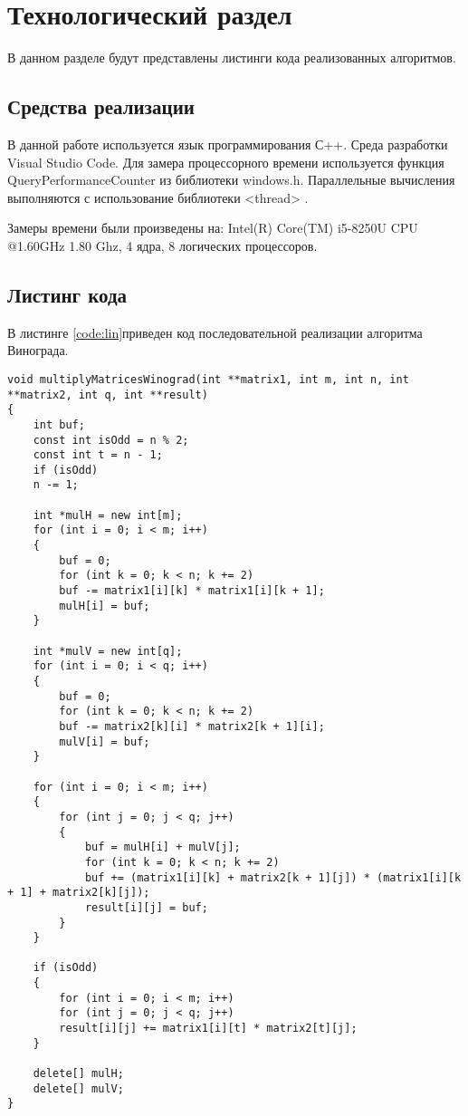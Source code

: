 \chapter{Технологический раздел}
\label{cha:impl}
В данном разделе будут представлены листинги кода реализованных алгоритмов.
\section{Средства реализации}
В данной работе используется язык программирования С++. Среда разработки Visual Studio Code. Для замера процессорного времени используется функция QueryPerformanceCounter из библиотеки windows.h. Параллельные вычисления выполняются с использование библиотеки <thread> \cite{threads}.
\par Замеры времени были произведены на: Intel(R) Core(TM) i5-8250U CPU @1.60GHz 1.80 Ghz, 4 ядра, 8 логических процессоров.

\section{Листинг кода}
В листинге \ref{code:lin}приведен код последовательной реализации алгоритма Винограда.
\begin{lstlisting}[caption= Алгоритм Винограда, label=code:lin]
void multiplyMatricesWinograd(int **matrix1, int m, int n, int **matrix2, int q, int **result)
{
	int buf;
	const int isOdd = n % 2;
	const int t = n - 1;
	if (isOdd)
	n -= 1;
	
	int *mulH = new int[m];
	for (int i = 0; i < m; i++)
	{
		buf = 0;
		for (int k = 0; k < n; k += 2)
		buf -= matrix1[i][k] * matrix1[i][k + 1];
		mulH[i] = buf;
	}
	
	int *mulV = new int[q];
	for (int i = 0; i < q; i++)
	{
		buf = 0;
		for (int k = 0; k < n; k += 2)
		buf -= matrix2[k][i] * matrix2[k + 1][i];
		mulV[i] = buf;
	}
	
	for (int i = 0; i < m; i++)
	{
		for (int j = 0; j < q; j++)
		{
			buf = mulH[i] + mulV[j];
			for (int k = 0; k < n; k += 2)
			buf += (matrix1[i][k] + matrix2[k + 1][j]) * (matrix1[i][k + 1] + matrix2[k][j]);
			result[i][j] = buf;
		}
	}
	
	if (isOdd)
	{
		for (int i = 0; i < m; i++)
		for (int j = 0; j < q; j++)
		result[i][j] += matrix1[i][t] * matrix2[t][j];
	}
	
	delete[] mulH;
	delete[] mulV;
}
\end{lstlisting}

